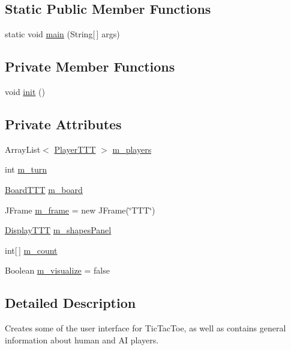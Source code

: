 \subsection*{Static Public Member Functions}
\begin{DoxyCompactItemize}
\item 
static void \hyperlink{class_game_1_1_game_t_t_t_a039bbaac8ea491c16fa231a69fd3b664}{main} (String\mbox{[}$\,$\mbox{]} args)
\end{DoxyCompactItemize}
\subsection*{Private Member Functions}
\begin{DoxyCompactItemize}
\item 
void \hyperlink{class_game_1_1_game_t_t_t_a34f74c29027f3e658cf080336255a533}{init} ()
\end{DoxyCompactItemize}
\subsection*{Private Attributes}
\begin{DoxyCompactItemize}
\item 
Array\+List$<$ \hyperlink{class_player_1_1_player_t_t_t}{Player\+T\+T\+T} $>$ \hyperlink{class_game_1_1_game_t_t_t_aad75ff74595b7b58542d7060a77ca169}{m\+\_\+players}
\item 
int \hyperlink{class_game_1_1_game_t_t_t_a2a4f4d1d24717d2629a2560421e926bc}{m\+\_\+turn}
\item 
\hyperlink{class_board_1_1_board_t_t_t}{Board\+T\+T\+T} \hyperlink{class_game_1_1_game_t_t_t_a7da768af1eaf7e75452a54391961275f}{m\+\_\+board}
\item 
J\+Frame \hyperlink{class_game_1_1_game_t_t_t_a1ddfe813d586411f16504069d6bddf5d}{m\+\_\+frame} = new J\+Frame(\char`\"{}T\+T\+T\char`\"{})
\item 
\hyperlink{class_display_1_1_display_t_t_t}{Display\+T\+T\+T} \hyperlink{class_game_1_1_game_t_t_t_a6b2de64f05009047dd3a01867da865c0}{m\+\_\+shapes\+Panel}
\item 
int\mbox{[}$\,$\mbox{]} \hyperlink{class_game_1_1_game_t_t_t_a79f50cdad0e0978bb30ac4ba2a96a971}{m\+\_\+count}
\item 
Boolean \hyperlink{class_game_1_1_game_t_t_t_ad1efe890e60af4826d664276e1e49ea4}{m\+\_\+visualize} = false
\end{DoxyCompactItemize}


\subsection{Detailed Description}
Creates some of the user interface for Tic\+Tac\+Toe, as well as contains general information about human and A\+I players. 

